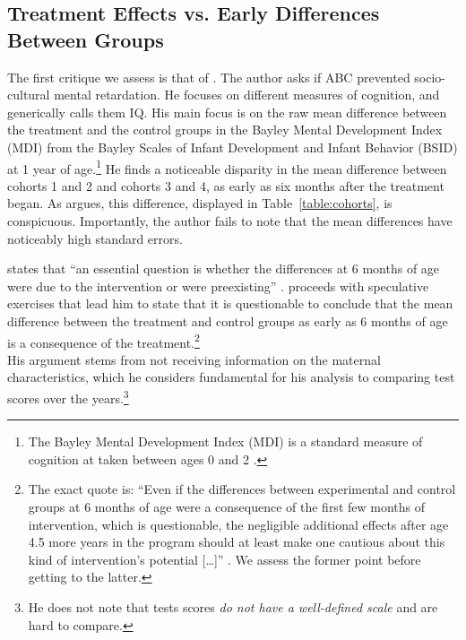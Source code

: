 \begin{appendices}
\subsection{Treatment Effects vs. Early Differences Between Groups}

\noindent The first critique we assess is that of \citet{Spitz_1992_ABC-Retardation}. The author asks if ABC prevented socio-cultural mental retardation. He focuses on different measures of cognition, and generically calls them IQ. His main focus is on the raw mean difference between the treatment and the control groups in the Bayley Mental Development Index (MDI) from the Bayley Scales of Infant Development and Infant Behavior (BSID) at 1 year of age.\footnote{The Bayley Mental Development Index (MDI) is a standard measure of cognition at taken between ages 0 and 2 \citep{Childrens-Health_2016_Bayley-Scales}.} He finds a noticeable disparity in the mean difference between cohorts 1 and 2 and cohorts 3 and 4, as early as six months after the treatment began. As \citet{Spitz_1992_ABC-Retardation} argues, this difference, displayed in Table~\ref{table:cohorts}, is conspicuous. Importantly, the author fails to note that the mean differences have noticeably high standard errors.



\noindent \citet{Spitz_1992_ABC-Retardation} states that ``an essential question is whether the differences at 6 months of age were due to the intervention or were preexisting'' \citep[][p. 230]{Spitz_1992_ABC-Retardation}. \citet{Spitz_1992_ABC-Retardation} proceeds with speculative exercises that lead him to state that it is questionable to conclude that the mean difference between the treatment and control groups as early as 6 months of age is a consequence of the treatment.\footnote{The exact quote is: ``Even if the differences between experimental and control groups at 6 months of age were a consequence of the first few months of intervention, which is questionable, the negligible additional effects after age 4.5 more years in the program should at least make one cautious about this kind of intervention's potential [\ldots]'' \citep[][p. 235]{Spitz_1992_ABC-Retardation}. We assess the former point before getting to the latter.}\\

\noindent His argument stems from not receiving information on the maternal characteristics, which he considers fundamental for his analysis to comparing test scores over the years.\footnote{He does not note that tests scores \textit{do not have a well-defined scale} and are hard to compare.}\\ 


\end{appendices}
